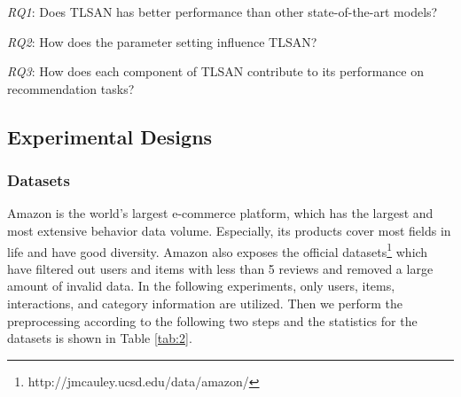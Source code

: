 \documentclass[preprint,12pt]{elsarticle}
\newcommand{\tool}{TLSAN\xspace}
\begin{document}
\begin{sloppypar}
\emph{RQ1}: Does \tool has better performance than other state-of-the-art models?

\emph{RQ2}: How does the parameter setting influence \tool?

\emph{RQ3}: How does each component of \tool contribute to its performance on recommendation tasks?

\subsection{Experimental Designs}
\subsubsection{Datasets}

Amazon is the world's largest e-commerce platform, which has the largest and most extensive behavior data volume. Especially, its products cover most fields in life and have good diversity. Amazon also exposes the official datasets\footnote{http://jmcauley.ucsd.edu/data/amazon/} which have filtered out users and items with less than 5 reviews and removed a large amount of invalid data. In the following experiments, only users, items, interactions, and category information are utilized. Then we perform the preprocessing according to the following two steps and the statistics for the datasets is shown in Table \ref{tab:2}.


\end{sloppypar}
\end{document}
